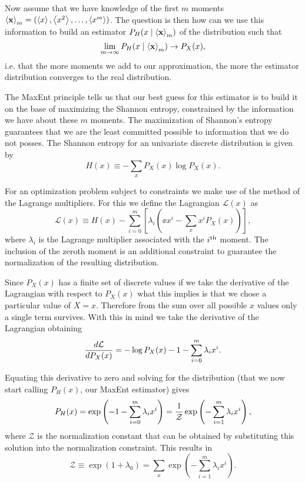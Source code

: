 Now assume that we have knowledge of the first $m$ moments $\mathbf{\left\langle x \right\rangle}_m = (
\left\langle x \right\rangle, \left\langle x^2 \right\rangle, \ldots, \left\langle x^m \right\rangle )$. The question is then how can we use this
information to build an estimator $P_H(x \mid \mathbf{\left\langle x \right\rangle}_m)$ of the
distribution
such that
\begin{equation}
  \lim_{m \rightarrow \infty} P_H(x \mid \mathbf{\left\langle x \right\rangle}_m) \rightarrow P_X(x),
\end{equation}
i.e. that the more moments we add to our approximation, the more the estimator
distribution converges to the real distribution.

The MaxEnt principle tells us that our best guess for this estimator is to build
it on the base of maximizing the Shannon entropy, constrained by the information
we have about these $m$ moments. The maximization of Shannon's entropy
guarantees that we are the least committed possible to information that we do
not posses. The Shannon entropy for an univariate discrete distribution is
given by
\begin{equation}
  H(x) \equiv - \sum_x P_X(x) \log P_X(x).
\end{equation}

For an optimization problem subject to constraints we make use of the method of
the Lagrange multipliers. For this we define the Lagrangian $\mathcal{L}(x)$ as
\begin{equation}
  \mathcal{L}(x) \equiv H(x) - \sum_{i=0}^m
  \left[ \lambda_i \left( \ee{x^i} - \sum_x x^i P_X(x) \right) \right],
\end{equation}
where $\lambda_i$ is the Lagrange multiplier associated with the $i^\text{th}$
moment. The inclusion of the zeroth moment is an additional constraint to
guarantee the normalization of the resulting distribution.

Since $P_X(x)$ has a finite set of discrete values if we take the derivative of
the Lagrangian with respect to $P_X(x)$ what this implies is that we chose a
particular value of $X = x$. Therefore from the sum over all possible $x$ values
only a single term survives. With this in mind we take the derivative of the
Lagrangian obtaining
\begin{equation}
  {d\mathcal{L} \over d P_X(x)} = -\log P_X(x) - 1 -
  \sum_{i=0}^m \lambda_i x^i.
\end{equation}

Equating this derivative to zero and solving for the distribution (that we now
start calling $P_H(x)$, our MaxEnt estimator) gives
\begin{equation}
  P_H(x) = \exp \left(- 1 - \sum_{i=0}^m \lambda_i x^i \right)
         ={1 \over \mathcal{Z}}
         \exp \left( - \sum_{i=1}^m \lambda_i x^i \right),
  \label{eq_maxEnt}
\end{equation}
where $\mathcal{Z}$ is the normalization constant that can be obtained by
substituting this solution into the normalization constraint. This results in
\begin{equation}
  \mathcal{Z} \equiv \exp\left( 1 + \lambda_0 \right) =
  \sum_x \exp \left( - \sum_{i=1}^m \lambda_i x^i \right).
\end{equation}

